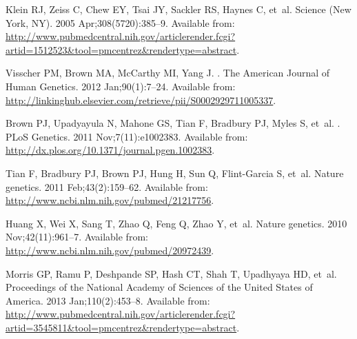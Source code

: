 \documentclass[10pt,letterpaper]{article}
\begin{document}
\begin{thebibliography}{10}
%
%
% 




Klein RJ, Zeiss C, Chew EY, Tsai JY, Sackler RS, Haynes C, et~al.
\newblock Science (New York, NY). 2005 Apr;308(5720):385--9.
\newblock Available from:
  \url{http://www.pubmedcentral.nih.gov/articlerender.fcgi?artid=1512523\&tool=pmcentrez\&rendertype=abstract}.

Visscher PM, Brown MA, McCarthy MI, Yang J.
.
\newblock The American Journal of Human Genetics. 2012 Jan;90(1):7--24.
\newblock Available from:
  \url{http://linkinghub.elsevier.com/retrieve/pii/S0002929711005337}.

Brown PJ, Upadyayula N, Mahone GS, Tian F, Bradbury PJ, Myles S, et~al.
.
\newblock PLoS Genetics. 2011 Nov;7(11):e1002383.
\newblock Available from:
  \url{http://dx.plos.org/10.1371/journal.pgen.1002383}.

Tian F, Bradbury PJ, Brown PJ, Hung H, Sun Q, Flint-Garcia S, et~al.
\newblock Nature genetics. 2011 Feb;43(2):159--62.
\newblock Available from: \url{http://www.ncbi.nlm.nih.gov/pubmed/21217756}.

Huang X, Wei X, Sang T, Zhao Q, Feng Q, Zhao Y, et~al.
\newblock Nature genetics. 2010 Nov;42(11):961--7.
\newblock Available from: \url{http://www.ncbi.nlm.nih.gov/pubmed/20972439}.

Morris GP, Ramu P, Deshpande SP, Hash CT, Shah T, Upadhyaya HD, et~al.
\newblock Proceedings of the National Academy of Sciences of the United States
  of America. 2013 Jan;110(2):453--8.
\newblock Available from:
  \url{http://www.pubmedcentral.nih.gov/articlerender.fcgi?artid=3545811\&tool=pmcentrez\&rendertype=abstract}.


\end{thebibliography}
\end{document}
